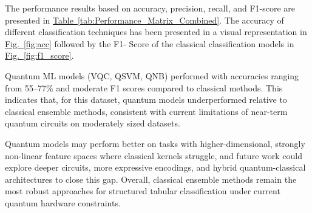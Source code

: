 \documentclass[runningheads]{llncs}
\begin{document}
The performance results based on accuracy, precision, recall, and F1-score are presented in \hyperref[tab:Performance_Matrix_Combined]{Table~\ref{tab:Performance_Matrix_Combined}}. The accuracy of different classification techniques has been presented in a visual representation in \hyperref[fig:acc]{Fig.~\ref{fig:acc}} followed by the F1- Score of the classical classification models in \hyperref[fig:f1_score]{Fig.~\ref{fig:f1_score}}.

Quantum ML models (VQC, QSVM, QNB) performed with accuracies ranging from 55--77\% and moderate F1 scores compared to classical methods. This indicates that, for this dataset, quantum models underperformed relative to classical ensemble methods, consistent with current limitations of near-term quantum circuits on moderately sized datasets.

Quantum models may perform better on tasks with higher-dimensional, strongly non-linear feature spaces where classical kernels struggle, and future work could explore deeper circuits, more expressive encodings, and hybrid quantum-classical architectures to close this gap. Overall, classical ensemble methods remain the most robust approaches for structured tabular classification under current quantum hardware constraints.
\end{document}
